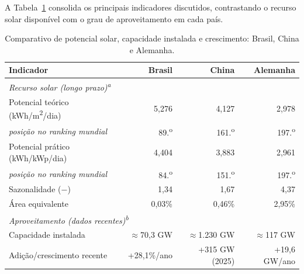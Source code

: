 A Tabela~\ref{tab:comparacao_paises} consolida os principais indicadores
discutidos, contrastando o recurso solar disponível com o grau de
aproveitamento em cada país.

\begin{table}[htbp]
\centering
\caption{Comparativo de potencial solar, capacidade instalada e crescimento:
Brasil, China e Alemanha.}
\label{tab:comparacao_paises}
\begin{tabular}{lrrr}
\hline
\textbf{Indicador} & \textbf{Brasil} & \textbf{China} & \textbf{Alemanha} \\
\hline
\multicolumn{4}{l}{\textit{Recurso solar (longo prazo)\textsuperscript{a}}} \\
\hline
Potencial teórico (kWh/m\textsuperscript{2}/dia) & 5,276 & 4,127 & 2,978 \\
\quad \textit{posição no ranking mundial}                & 89.\textsuperscript{o} & 161.\textsuperscript{o} & 197.\textsuperscript{o} \\
Potencial prático (kWh/kWp/dia)                & 4,404 & 3,883 & 2,961 \\
\quad \textit{posição no ranking mundial}                & 84.\textsuperscript{o} & 151.\textsuperscript{o} & 197.\textsuperscript{o} \\
Sazonalidade ($-$)                             & 1,34 & 1,67 & 4,37 \\
Área equivalente                      & 0,03\% & 0,46\% & 2,95\% \\
\hline
\multicolumn{4}{l}{\textit{Aproveitamento (dados recentes)\textsuperscript{b}}} \\
\hline
Capacidade instalada                                     & $\approx$70,3 GW & $\approx$1.230 GW & $\approx$117 GW \\
Adição/crescimento recente                               & +28,1\%/ano & +315 GW (2025) & +19,6 GW/ano \\
\hline
\end{tabular}
\end{table}

